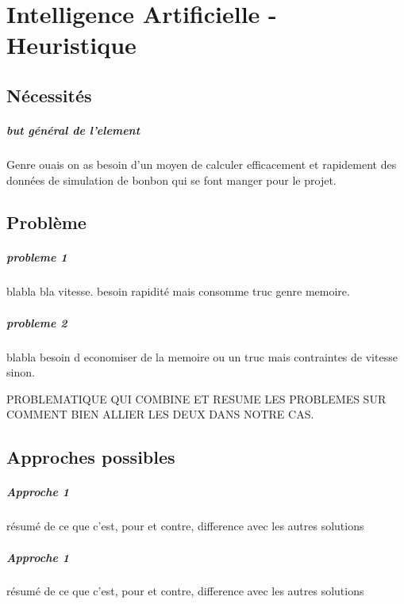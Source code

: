 \chapter{Intelligence Artificielle - Heuristique}

	\section{Nécessités}
	
		\paragraph{but général de l'element}
		Genre ouais on as besoin d'un moyen de calculer efficacement et rapidement des données de simulation de bonbon qui se font manger pour le projet.
 
	
	\section{Problème}
	
		\paragraph{probleme 1}
		blabla bla vitesse. besoin rapidité mais consomme truc genre memoire.
		
		\paragraph{probleme 2}
		blabla besoin d economiser de la memoire ou un truc mais contraintes de vitesse sinon.
	
		\begin{problem}
			PROBLEMATIQUE QUI COMBINE ET RESUME LES PROBLEMES SUR COMMENT BIEN ALLIER LES DEUX DANS NOTRE CAS.
		\end{problem}
	
	\section{Approches possibles}
	
		\paragraph{Approche 1}
		résumé de ce que c'est, pour et contre, difference avec les autres solutions
		
		
		\paragraph{Approche 1}
		résumé de ce que c'est, pour et contre, difference avec les autres solutions
	
